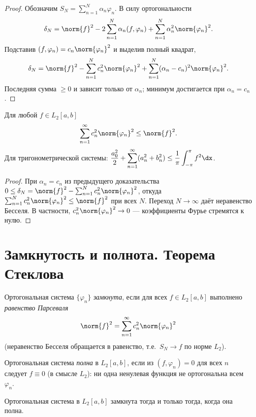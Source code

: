 \begin{proof}
Обозначим $S_N=\sum_{n=1}^N\alpha_n\varphi_n$. В силу ортогональности
\[
  \delta_N=\norm{f}^2-2\sum_{n=1}^N\alpha_n(f,\varphi_n)+\sum_{n=1}^N\alpha_n^2\norm{\varphi_n}^2 .
\]
Подставив $(f,\varphi_n)=c_n\norm{\varphi_n}^2$ и выделив полный квадрат,
\[
  \delta_N=\norm{f}^2-\sum_{n=1}^N c_n^2\norm{\varphi_n}^2
   +\sum_{n=1}^N(\alpha_n-c_n)^2\norm{\varphi_n}^2 .
\]
Последняя сумма $\ge0$ и зависит только от $\alpha_n$; минимум достигается при $\alpha_n=c_n$.
\end{proof}

\begin{theorem}
Для любой $f\in L_2[a,b]$
\[
  \sum_{n=1}^\infty c_n^2\norm{\varphi_n}^2\le\norm{f}^2 .
\]
Для тригонометрической системы:
$\displaystyle\frac{a_0^2}{2}+\sum_{n=1}^\infty(a_n^2+b_n^2)\le\frac1\pi\int_{-\pi}^{\pi}f^2\dx$.
\end{theorem}

\begin{proof}
При $\alpha_n=c_n$ из предыдущего доказательства
$0\le\delta_N=\norm{f}^2-\sum_{n=1}^N c_n^2\norm{\varphi_n}^2$, откуда
$\sum_{n=1}^N c_n^2\norm{\varphi_n}^2\le\norm{f}^2$ при всех $N$. Переход $N\to\infty$ даёт
неравенство Бесселя. В частности, $c_n^2\norm{\varphi_n}^2\to0$ — коэффициенты Фурье стремятся к
нулю.
\end{proof}

\section{Замкнутость и полнота. Теорема Стеклова}

\begin{definition}
Ортогональная система $\{\varphi_n\}$ \emph{замкнута}, если для всех $f\in L_2[a,b]$ выполнено
\emph{равенство Парсеваля}
\[
  \norm{f}^2=\sum_{n=1}^\infty c_n^2\norm{\varphi_n}^2
\]
(неравенство Бесселя обращается в равенство, т.е.\ $S_N\to f$ по норме $L_2$).
\end{definition}

\begin{definition}
Ортогональная система \emph{полна} в $L_2[a,b]$, если из $(f,\varphi_n)=0$ для всех $n$ следует
$f\equiv0$ (в смысле $L_2$): ни одна ненулевая функция не ортогональна всем $\varphi_n$.
\end{definition}

\begin{theorem}
Ортогональная система в $L_2[a,b]$ замкнута тогда и только тогда, когда она полна.
\end{theorem}

